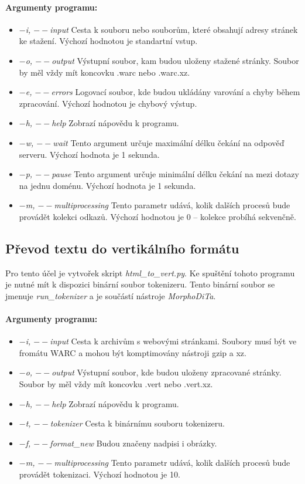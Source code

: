 \paragraph{Argumenty programu: }
\begin{itemize}
    \item \textit{$-$i, $--$input} Cesta k souboru nebo souborům, které obsahují adresy stránek ke stažení. Výchozí hodnotou je standartní vstup.
    \item \textit{$-$o, $--$output} Výstupní soubor, kam budou uloženy stažené stránky. Soubor by měl vždy mít koncovku .warc nebo .warc.xz.
    \item \textit{$-$e, $--$errors} Logovací soubor, kde budou ukládány varování a chyby během zpracování. Výchozí hodnotou je chybový výstup.
    \item \textit{$-$h, $--$help} Zobrazí nápovědu k programu.
    \item \textit{$-$w, $--$wait} Tento argument určuje maximální délku čekání na odpověď serveru. Výchozí hodnota je 1 sekunda.
    \item \textit{$-$p, $--$pause} Tento argument určuje minimální délku čekání na mezi dotazy na jednu doménu. Výchozí hodnota je 1 sekunda.
    \item \textit{$-$m, $--$multiprocessing} Tento parametr udává, kolik dalších procesů bude provádět kolekci odkazů. Výchozí hodnotou je 0 -- kolekce probíhá sekvenčně.
\end{itemize}

\subsection{Převod textu do vertikálního formátu}
Pro tento účel je vytvořek skript \textit{html\_to\_vert.py}. Ke spuštění tohoto programu je nutné mít
k dispozici binární soubor tokenizeru. Tento binární soubor se jmenuje \textit{run\_tokenizer} a je
součástí nástroje \textit{MorphoDiTa}.

\paragraph{Argumenty programu: }
\begin{itemize}
    \item \textit{$-$i, $--$input} Cesta k archivům s webovými stránkami. Soubory musí být ve fromátu WARC a mohou být komptimovány nástroji gzip a xz.
    \item \textit{$-$o, $--$output} Výstupní soubor, kde budou uloženy zpracované stránky. Soubor by měl vždy mít koncovku .vert nebo .vert.xz.
    \item \textit{$-$h, $--$help} Zobrazí nápovědu k programu.
    \item \textit{$-$t, $--$tokenizer} Cesta k binárnímu souboru tokenizeru.
    \item \textit{$-$f, $--$format\_new} Budou značeny nadpisi i obrázky.
    \item \textit{$-$m, $--$multiprocessing} Tento parametr udává, kolik dalších procesů bude provádět tokenizaci. Výchozí hodnotou je 10.
\end{itemize}

